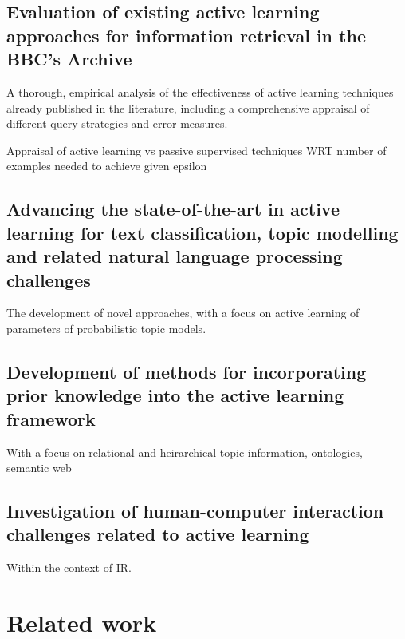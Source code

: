 \documentclass[a4paper, 11pt]{article}
\begin{document}
\subsection{Evaluation of existing active learning approaches for information retrieval in the BBC's Archive}

A thorough, empirical analysis of the effectiveness of active learning techniques already published in the literature, including a comprehensive appraisal of different query strategies and error measures.

Appraisal of active learning vs passive supervised techniques WRT number of examples needed to achieve given epsilon

\subsection{Advancing the state-of-the-art in active learning for text classification, topic modelling and related natural language processing challenges}

The development of novel approaches, with a focus on active learning of parameters of probabilistic topic models.

\subsection{Development of methods for incorporating prior knowledge into the active learning framework}

With a focus on relational and heirarchical topic information, ontologies, semantic web

\subsection{Investigation of human-computer interaction challenges related to active learning}

Within the context of IR.
\label{sec:Methodology}
\section{Related work}
\label{sec:Related work}
\printbibliography
\end{document}
